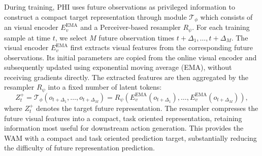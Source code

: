 \documentclass{article} %
\begin{document}
During training, PHI uses future observations as privileged information to construct a compact target representation through module
$\mathcal{T}_{\phi}$ which consists of an visual encoder
$E_v^{\mathrm{EMA}}$ and a Perceiver-based resampler $R_\psi$. For each
training sample at time $t$, we select $M$ future observation times
$t+\Delta_1,\ldots,t+\Delta_M$. The visual encoder
$E_v^{\mathrm{EMA}}$ first extracts visual features from the corresponding
future observations. Its initial parameters are copied from the online
visual encoder and subsequently updated using exponential moving average
(EMA), without receiving gradients directly. The extracted features are
then aggregated by the resampler $R_\psi$ into a fixed number of latent
tokens:
\begin{equation}
    Z_t^{+}
    =
    \mathcal{T}_{\phi}
    \left(
        o_{t+\Delta_1},\ldots,o_{t+\Delta_M}
    \right)
    =
    R_\psi
    \left(
        E_v^{\mathrm{EMA}}(o_{t+\Delta_1}),
        \ldots,
        E_v^{\mathrm{EMA}}(o_{t+\Delta_M})
    \right),
\end{equation}
where $Z_t^{+}$ denotes the target future representation. The resampler
compresses the future visual features into a compact, task oriented
representation, retaining information most useful for downstream action
generation. This provides the WAM with a compact and task oriented
prediction target, substantially reducing the difficulty of future
representation prediction.





\end{document}
